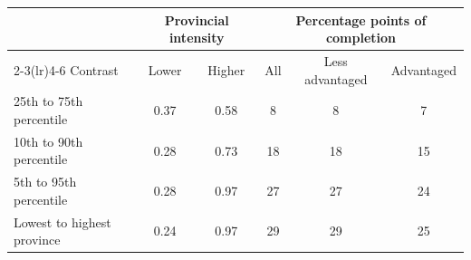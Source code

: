 \begin{tabular}{@{}lccccc@{}}
\toprule
 & \multicolumn{2}{c}{Provincial intensity} & \multicolumn{3}{c}{Percentage points of completion} \\
\cmidrule(lr){2-3}\cmidrule(lr){4-6}
Contrast & Lower & Higher & All & Less advantaged & Advantaged \\
\midrule
25th to 75th percentile & 0.37 & 0.58 & 8 & 8 & 7 \\
10th to 90th percentile & 0.28 & 0.73 & 18 & 18 & 15 \\
5th to 95th percentile & 0.28 & 0.97 & 27 & 27 & 24 \\
Lowest to highest province & 0.24 & 0.97 & 29 & 29 & 25 \\
\bottomrule
\end{tabular}
